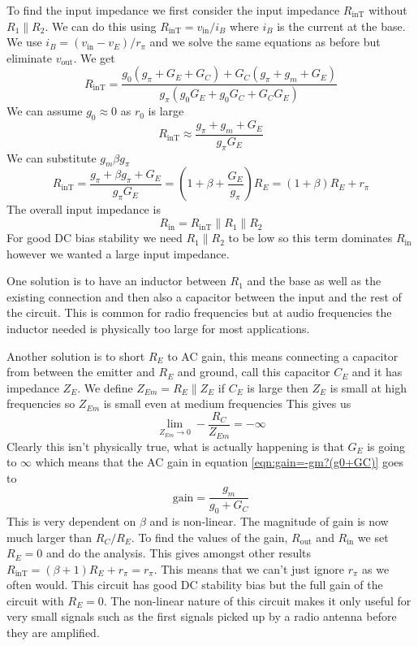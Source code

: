 \documentclass{article}
\begin{document}
    To find the input impedance we first consider the input impedance \(R_\text{inT}\) without \(R_1\parallel R_2\).
    We can do this using \(R_\text{inT} = v_\text{in}/i_B\) where \(i_B\) is the current at the base.
    We use \(i_B = (v_\text{in} - v_E)/r_\pi\) and we solve the same equations as before but eliminate \(v_\text{out}\).
    We get
    \[R_\text{inT} = \frac{g_0(g_\pi + G_E + G_C) + G_C(g_\pi + g_m + G_E)}{g_\pi(g_0G_E + g_0G_C + G_CG_E)}\]
    We can assume \(g_0\approx 0\) as \(r_0\) is large
    \[R_\text{inT}\approx \frac{g_\pi + g_m + G_E}{g_\pi G_E}\]
    We can substitute \(g_m \beta g_\pi\)
    \[R_\text{inT} = \frac{g_\pi + \beta g_\pi + G_E}{g_\pi G_E} = \left(1 + \beta + \frac{G_E}{g_\pi}\right)R_E = (1 + \beta)R_E + r_\pi\]
    The overall input impedance is
    \[R_\text{in} = R_\text{inT}\parallel R_1\parallel R_2\]
    For good DC bias stability we need \(R_1\parallel R_2\) to be low so this term dominates \(R_\text{in}\) however we wanted a large input impedance.
    
    One solution is to have an inductor between \(R_1\) and the base as well as the existing connection and then also a capacitor between the input and the rest of the circuit.
    This is common for radio frequencies but at audio frequencies the inductor needed is physically too large for most applications.
    
    Another solution is to short \(R_E\) to AC gain, this means connecting a capacitor from between the emitter and \(R_E\) and ground, call this capacitor \(C_E\) and it has impedance \(Z_E\).
    We define \(Z_{Em} = R_E\parallel Z_E\) if \(C_E\) is large then \(Z_E\) is small at high frequencies so \(Z_{Em}\) is small even at medium frequencies
    This gives us
    \[\lim_{Z_{Em}\to 0}-\frac{R_C}{Z_{Em}} = -\infty\]
    Clearly this isn't physically true, what is actually happening is that \(G_E\) is going to \(\infty\) which means that the AC gain in equation \ref{eqn:gain=-gm?(g0+GC)} goes to
    \[\text{gain} = \frac{g_m}{g_0+ G_C}\]
    This is very dependent on \(\beta\) and is non-linear.
    The magnitude of gain is now much larger than \(R_C/R_E\).
    To find the values of the gain, \(R_\text{out}\) and \(R_\text{in}\) we set \(R_E = 0\) and do the analysis.
    This gives amongst other results \(R_\text{inT} = (\beta + 1)R_E + r_\pi = r_\pi\). This means that we can't just ignore \(r_\pi\) as we often would.
    This circuit has good DC stability bias but the full gain of the circuit with \(R_E = 0\).
    The non-linear nature of this circuit makes it only useful for very small signals such as the first signals picked up by a radio antenna before they are amplified.
    
\end{document}
